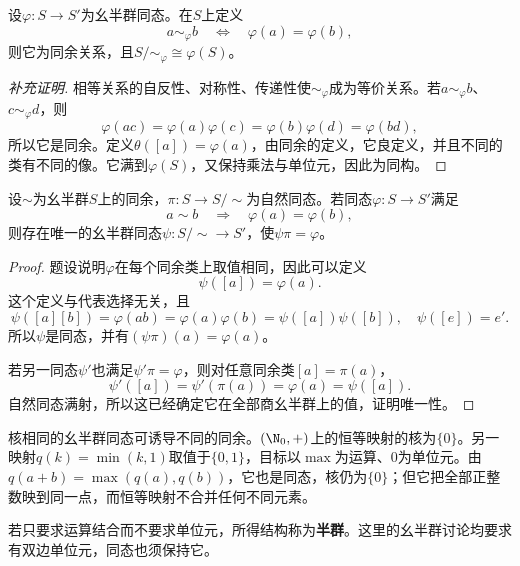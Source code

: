 \begin{theorem}
设$\varphi:S\to S'$为幺半群同态。在$S$上定义
\[
a\sim_\varphi b\quad\Longleftrightarrow\quad\varphi(a)=\varphi(b),
\]
则它为同余关系，且$S/{\sim_\varphi}\cong\varphi(S)$。
\end{theorem}
\begin{proof}[补充证明]
相等关系的自反性、对称性、传递性使$\sim_\varphi$成为等价关系。若$a\sim_\varphi b$、$c\sim_\varphi d$，则
\[
\varphi(ac)=\varphi(a)\varphi(c)=\varphi(b)\varphi(d)=\varphi(bd),
\]
所以它是同余。定义$\theta([a])=\varphi(a)$，由同余的定义，它良定义，并且不同的类有不同的像。它满到$\varphi(S)$，又保持乘法与单位元，因此为同构。
\end{proof}

\begin{theorem}\label{p2:monoid-factor}
设$\sim$为幺半群$S$上的同余，$\pi:S\to S/{\sim}$为自然同态。若同态$\varphi:S\to S'$满足
\[
a\sim b\quad\Longrightarrow\quad\varphi(a)=\varphi(b),
\]
则存在唯一的幺半群同态$\psi:S/{\sim}\to S'$，使$\psi\pi=\varphi$。
\end{theorem}
\begin{proof}
题设说明$\varphi$在每个同余类上取值相同，因此可以定义
\[
\psi([a])=\varphi(a).
\]
这个定义与代表选择无关，且
\[
\psi([a][b])=\varphi(ab)=\varphi(a)\varphi(b)=\psi([a])\psi([b]),
\quad\psi([e])=e'.
\]
所以$\psi$是同态，并有$(\psi\pi)(a)=\varphi(a)$。

若另一同态$\psi'$也满足$\psi'\pi=\varphi$，则对任意同余类$[a]=\pi(a)$，
\[
\psi'([a])=\psi'(\pi(a))=\varphi(a)=\psi([a]).
\]
自然同态满射，所以这已经确定它在全部商幺半群上的值，证明唯一性。
\end{proof}

\begin{example}
核相同的幺半群同态可诱导不同的同余。$(\N_0,+)$上的恒等映射的核为$\{0\}$。另一映射$q(k)=\min(k,1)$取值于$\{0,1\}$，目标以$\max$为运算、0为单位元。由$q(a+b)=\max(q(a),q(b))$，它也是同态，核仍为$\{0\}$；但它把全部正整数映到同一点，而恒等映射不合并任何不同元素。
\end{example}

若只要求运算结合而不要求单位元，所得结构称为\textbf{半群}。这里的幺半群讨论均要求有双边单位元，同态也须保持它。
